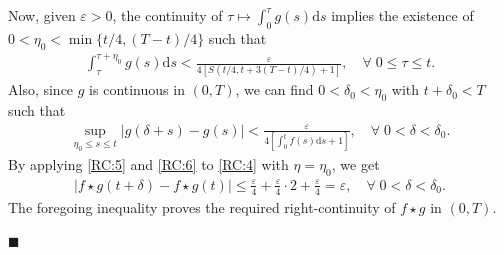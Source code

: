 \documentclass[12pt, twoside]{article}
\numberwithin{figure}{section}
\newcommand{\1}{\mathds 1}
\newcommand{\vep}{{\varepsilon}}
\renewcommand{\d}{{\mathrm d}}
\newcommand{\2}{{\mathbf 1}}
\renewenvironment{proof}[1][\proofname]{\noindent {\bfseries #1.}\;}{\hfill\ensuremath{\blacksquare}\\}
\begin{document}
\begin{proof}
Now, given $\vep>0$, the continuity of $\tau\mapsto \int_0^\tau g(s)\d s$ implies the existence of $0<\eta_0<\min\{t/4,(T-t)/4\}$ such that 
\begin{align}\label{RC:5}
\int_\tau^{\tau+\eta_0}g(s)\d s<\frac{\vep}{4[S(t/4,t+3(T-t)/4)+1]},\quad \forall\;0\leq \tau\leq t.
\end{align}
Also, since $g$ is continuous in $(0,T)$, we can find $0<\delta_0<\eta_0$ with $t+\delta_0<T$ such that 
\begin{align}\label{RC:6}
\sup_{\eta_0\leq s\leq t}|g(\delta+s)-g(s)|<\frac{\vep}{4[\int_0^t f(s)\d s+1]},\quad \forall\;0<\delta<\delta_0.
\end{align}
By applying \eqref{RC:5} and \eqref{RC:6} to \eqref{RC:4} with $\eta=\eta_0$, we get 
\begin{align*}
|f\star g(t+\delta)-f\star g(t)|\leq \frac{\vep}{4}+\frac{\vep}{4}\cdot 2+\frac{\vep}{4}=\vep,\quad\forall\;0<\delta<\delta_0.
\end{align*}
The foregoing inequality proves the required right-continuity of $f\star g$ in $(0,T)$.


\end{proof}
\end{document}
